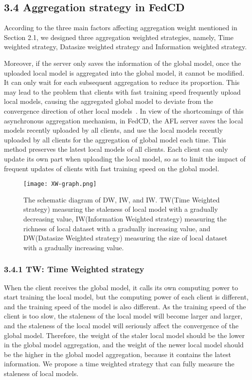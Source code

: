 \documentclass[twoside,twocolumn]{article}
\begin{document}
\subsection{3.4 Aggregation strategy in FedCD}

	According to the three main factors affecting aggregation weight mentioned in Section 2.1, we designed three aggregation weighted strategies, namely, Time weighted strategy, Datasize weighted strategy and Information weighted strategy.
	
	Moreover, if the server only saves the information of the global model, once the uploaded local model is aggregated into the global model, it cannot be modified. It can only wait for each subsequent aggregation to reduce its proportion. This may lead to the problem that clients with fast training speed frequently upload local models, causing the aggregated global model to deviate from the convergence direction of other local models~\cite{chen2021asynchronous}. In view of the shortcomings of this asynchronous aggregation mechanism, in FedCD, the AFL server saves the local models recently uploaded by all clients, and use the local models recently uploaded by all clients for the aggregation of global model each time. This method preserves the latest local models of all clients. Each client can only update its own part when uploading the local model, so as to limit the impact of frequent updates of clients with fast training speed on the global model.
\begin{figure*}
\centerline{\texttt{[image: XW-graph.png]}}
\caption{The schematic diagram of DW, IW, and IW. TW(Time Weighted strategy) measuring the staleness of local model with a gradually decreasing value, IW(Information Weighted strategy) measuring the richness of local dataset with a gradually increasing value, and DW(Datasize Weighted strategy) measuring the size of local dataset with a gradually increasing value.} \label{fig2}
\end{figure*}

\subsubsection{3.4.1 TW: Time Weighted strategy} When the client receives the global model, it calls its own computing power to start training the local model, but the computing power of each client is different, and the training speed of the model is also different. As the training speed of the client is too slow, the staleness of the local model will become larger and larger, and the staleness of the local model will seriously affect the convergence of the global model. Therefore, the weight of the staler local model should be the lower in the global model aggregation, and the weight of the newer local model should be the higher in the global model aggregation, because it contains the latest information. We propose a time weighted strategy that can fully measure the staleness of local models.
\end{document}
